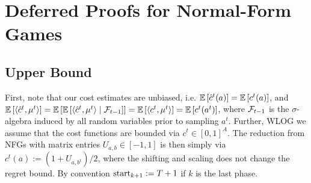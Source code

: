 \section{Deferred Proofs for Normal-Form Games} \label{app:nfg}

\subsection{Upper Bound} \label{app:nfg-upper}

First, note that our cost estimates are unbiased, i.e. 
$\mathbb{E}\left[ \hat{c}^t(a) \right] = \mathbb{E}\left[  c^t(a)  \right]$, and $\mathbb{E}\left[  \left\langle \hat{c}^t, \mu^t \right\rangle  \right] = \mathbb{E}\left[ \mathbb{E}\left[  \left\langle \hat{c}^t, \mu^t \right\rangle \mid \mathcal{F}_{t-1}  \right] \right] = \mathbb{E}\left[  \left\langle c^t, \mu^t \right\rangle  \right] = \mathbb{E}\left[ c^t(a^t)  \right]$, where $\mathcal{F}_{t-1}$ is the $\sigma$-algebra induced by all random variables prior to sampling $a^t$. Further, WLOG we assume that the cost functions are bounded via $c^t\in[0,1]^A$. The reduction from NFGs with matrix entries $U_{a,b}\in[-1,1]$ is then simply via $c^t(a):=(1+U_{a,b^t})/2$, where the shifting and scaling does not change the regret bound. By convention $\text{start}_{k+1}:=T+1$ if $k$ is the last phase.

\thmUbSimplexBandit*

